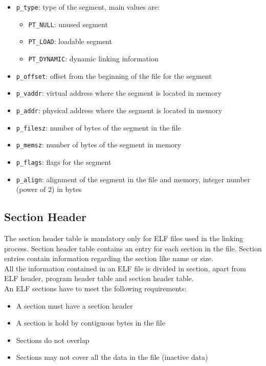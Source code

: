\begin{itemize}
	\item \texttt{p\_type}: type of the segment, main values are:
		\begin{itemize}
			\item \texttt{PT\_NULL}: unused segment
			\item \texttt{PT\_LOAD}: loadable segment
			\item \texttt{PT\_DYNAMIC}: dynamic linking information
		\end{itemize}
	\item \texttt{p\_offset}: offset from the beginning of the file for the segment
	\item \texttt{p\_vaddr}: virtual address where the segment is located in memory
	\item \texttt{p\_addr}: physical address where the segment is located in memory
	\item \texttt{p\_filesz}: number of bytes of the segment in the file
	\item \texttt{p\_memsz}: number of bytes of the segment in memory
	\item \texttt{p\_flags}: flags for the segment
	\item \texttt{p\_align}: alignment of the segment in the file and memory, integer number (power of 2) in bytes
\end{itemize}

\subsection{Section Header}

The section header table is mandatory only for ELF files used in the linking process. Section header table contains an entry for each section in the file. Section entries contain information regarding the section like name or size.\\
All the information contained in an ELF file is divided in section, apart from ELF header, program header table and section header table.\\
An ELF sections have to meet the following requirements:
\begin{itemize} 
	\item A section must have a section header
	\item A section is hold by contiguous bytes in the file
	\item Sections do not overlap
	\item Sections may not cover all the data in the file (inactive data)
\end{itemize}

